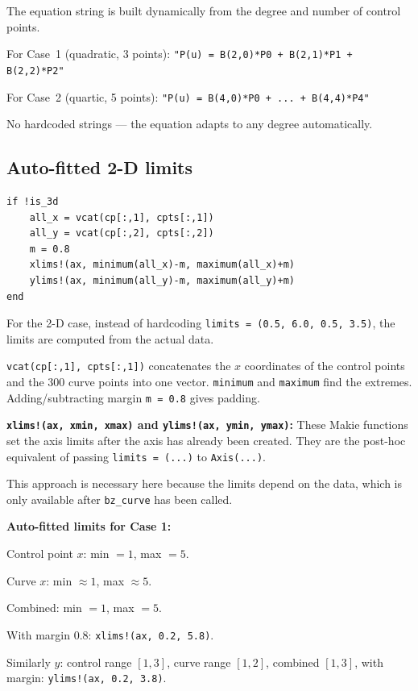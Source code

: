 \documentclass[12pt, a4paper]{article}
\newcommand{\cd}[1]{\texttt{#1}}
\begin{document}
The equation string is built dynamically from the degree
and number of control points.

For Case~1 (quadratic, 3 points):
\cd{"P(u) = B(2,0)*P0 + B(2,1)*P1 + B(2,2)*P2"}

For Case~2 (quartic, 5 points):
\cd{"P(u) = B(4,0)*P0 + ... + B(4,4)*P4"}

No hardcoded strings --- the equation adapts to any
degree automatically.

\subsection{Auto-fitted 2-D limits}

\begin{verbatim}
if !is_3d
    all_x = vcat(cp[:,1], cpts[:,1])
    all_y = vcat(cp[:,2], cpts[:,2])
    m = 0.8
    xlims!(ax, minimum(all_x)-m, maximum(all_x)+m)
    ylims!(ax, minimum(all_y)-m, maximum(all_y)+m)
end
\end{verbatim}

For the 2-D case, instead of hardcoding
\cd{limits = (0.5, 6.0, 0.5, 3.5)},
the limits are computed from the actual data.

\cd{vcat(cp[:,1], cpts[:,1])} concatenates the $x$
coordinates of the control points and the 300 curve
points into one vector.
\cd{minimum} and \cd{maximum} find the extremes.
Adding/subtracting margin \cd{m = 0.8} gives padding.

\textbf{\cd{xlims!(ax, xmin, xmax)} and \cd{ylims!(ax, ymin, ymax)}:}
These Makie functions set the axis limits after the
axis has already been created.
They are the post-hoc equivalent of passing
\cd{limits = (...)} to \cd{Axis(...)}.

This approach is necessary here because the limits
depend on the data, which is only available after
\cd{bz\_curve} has been called.

\begin{examplebox}
\textbf{Auto-fitted limits for Case 1:}

Control point $x$: min $= 1$, max $= 5$.

Curve $x$: min $\approx 1$, max $\approx 5$.

Combined: min $= 1$, max $= 5$.

With margin 0.8: \cd{xlims!(ax, 0.2, 5.8)}.

Similarly $y$: control range $[1, 3]$, curve range $[1, 2]$,
combined $[1, 3]$, with margin: \cd{ylims!(ax, 0.2, 3.8)}.
\end{examplebox}
\end{document}
